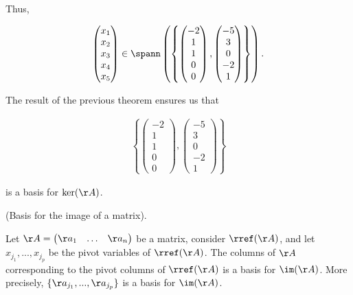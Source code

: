 \begin{example}
    Thus,

    \begin{align*}
        \begin{pmatrix}
            x_1 \\ x_2 \\ x_3 \\ x_4 \\ x_5
        \end{pmatrix}
        \in\spann\left(\left\{
        \begin{pmatrix}
            -2 \\ 1 \\ 1 \\ 0 \\ 0
        \end{pmatrix},
        \begin{pmatrix}
            -5 \\ 3 \\ 0 \\ -2 \\ 1
        \end{pmatrix}
        \right\}\right).
    \end{align*}

    The result of the previous theorem ensures us that

    \begin{align*}
        \left\{
        \begin{pmatrix}
            -2 \\ 1 \\ 1 \\ 0 \\ 0
        \end{pmatrix},
        \begin{pmatrix}
            -5 \\ 3 \\ 0 \\ -2 \\ 1
        \end{pmatrix}
        \right\}
    \end{align*}

    is a basis for $\ker(\AA)$. 
\end{example}

\begin{theorem}
    (Basis for the image of a matrix).

    Let $\AA = \begin{pmatrix} \aa_1 & \hdots & \aa_n \end{pmatrix}$ be a matrix, consider $\rref(\AA)$, and let $x_{j_1}, ..., x_{j_p}$ be the pivot variables of $\rref(\AA)$. The columns of $\AA$ corresponding to the pivot columns of $\rref(\AA)$ is a basis for $\im(\AA)$. More precisely, $\{\aa_{j_1}, ..., \aa_{j_p}\}$ is a basis for $\im(\AA)$.
\end{theorem}

